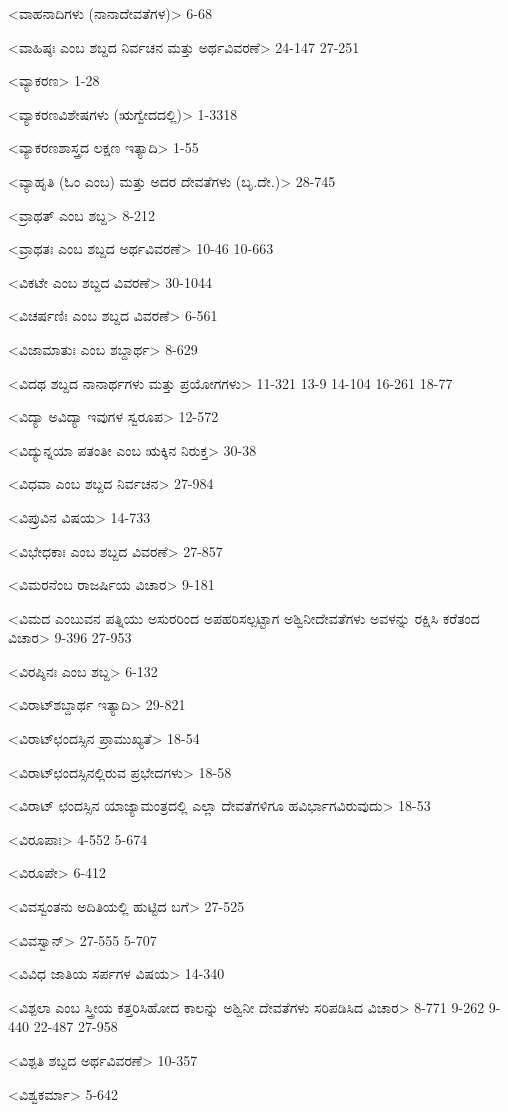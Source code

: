 <ವಾಹನಾದಿಗಳು (ನಾನಾದೇವತೆಗಳ)>
6-68

<ವಾಹಿಷ್ಠಃ ಎಂಬ ಶಬ್ದದ ನಿರ್ವಚನ ಮತ್ತು ಅರ್ಥವಿವರಣೆ>
24-147
27-251

<ವ್ಯಾಕರಣ>
1-28

<ವ್ಯಾಕರಣವಿಶೇಷಗಳು (ಋಗ್ವೇದದಲ್ಲಿ)>
1-3318

<ವ್ಯಾಕರಣಶಾಸ್ತ್ರದ ಲಕ್ಷಣ ಇತ್ಯಾದಿ>
1-55

<ವ್ಯಾಹೃತಿ (ಓಂ ಎಂಬ) ಮತ್ತು ಅದರ ದೇವತೆಗಳು (ಬೃ.ದೇ.)>
28-745

<ವ್ರಾಥತ್‍ ಎಂಬ ಶಬ್ದ>
8-212

<ವ್ರಾಥತಃ ಎಂಬ ಶಬ್ದದ ಅರ್ಥವಿವರಣೆ>
10-46 
10-663

<ವಿಕಟೇ ಎಂಬ ಶಬ್ದದ ವಿವರಣೆ>
30-1044

<ವಿಚರ್ಷಣಿಃ ಎಂಬ ಶಬ್ದದ ವಿವರಣೆ>
6-561

<ವಿಜಾಮಾತುಃ ಎಂಬ ಶಬ್ದಾರ್ಥ>
8-629

<ವಿದಥ ಶಬ್ದದ ನಾನಾರ್ಥಗಳು ಮತ್ತು ಪ್ರಯೋಗಗಳು>
11-321 
13-9 
14-104 
16-261
18-77

<ವಿದ್ಯಾ ಅವಿದ್ಯಾ ಇವುಗಳ ಸ್ವರೂಪ>
12-572

<ವಿದ್ಯುನ್ನಯಾ ಪತಂತೀ ಎಂಬ ಋಕ್ಕಿನ ನಿರುಕ್ತ>
30-38

<ವಿಧವಾ ಎಂಬ ಶಬ್ದದ ನಿರ್ವಚನ>
27-984

<ವಿಪ್ರುವಿನ ವಿಷಯ>
14-733

<ವಿಭೇಧಕಾಃ ಎಂಬ ಶಬ್ದದ ವಿವರಣೆ>
27-857

<ವಿಮರನೆಂಬ ರಾಜರ್ಷಿಯ ವಿಚಾರ>
9-181

<ವಿಮದ ಎಂಬುವನ ಪತ್ನಿಯು ಅಸುರರಿಂದ ಅಪಹರಿಸಲ್ಪಟ್ಟಾಗ ಅಶ್ವಿನೀದೇವತೆಗಳು ಅವಳನ್ನು ರಕ್ಷಿಸಿ ಕರೆತಂದ ವಿಚಾರ>
9-396
27-953

<ವಿರಪ್ಶಿನಃ ಎಂಬ ಶಬ್ದ>
6-132

<ವಿರಾಟ್‍ಶಬ್ದಾರ್ಥ ಇತ್ಯಾದಿ>
29-821

<ವಿರಾಟ್‍ಛಂದಸ್ಸಿನ ಪ್ರಾಮುಖ್ಯತೆ>
18-54

<ವಿರಾಟ್‍ಛಂದಸ್ಸಿನಲ್ಲಿರುವ ಪ್ರಭೇದಗಳು>
18-58

<ವಿರಾಟ್‍ ಛಂದಸ್ಸಿನ ಯಾಜ್ಯಾಮಂತ್ರದಲ್ಲಿ ಎಲ್ಲಾ ದೇವತೆಗಳಿಗೂ ಹವಿರ್ಭಾಗವಿರುವುದು>
18-53

<ವಿರೂಪಾಃ>
4-552
5-674

<ವಿರೂಪೇ>
6-412

<ವಿವಸ್ವಂತನು ಅದಿತಿಯಲ್ಲಿ ಹುಟ್ಟಿದ ಬಗೆ>
27-525

<ವಿವಸ್ವಾನ್‍>
27-555
5-707

<ವಿವಿಧ ಜಾತಿಯ ಸರ್ಪಗಳ ವಿಷಯ>
14-340

<ವಿಶ್ಪಲಾ ಎಂಬ ಸ್ತ್ರೀಯ ಕತ್ತರಿಸಿಹೋದ ಕಾಲನ್ನು ಅಶ್ವಿನೀ ದೇವತೆಗಳು ಸರಿಪಡಿಸಿದ ವಿಚಾರ>
8-771
9-262 
9-440
22-487 
27-958

<ವಿಶ್ಪತಿ ಶಬ್ದದ ಅರ್ಥವಿವರಣೆ>
10-357

<ವಿಶ್ವಕರ್ಮಾ>
5-642

